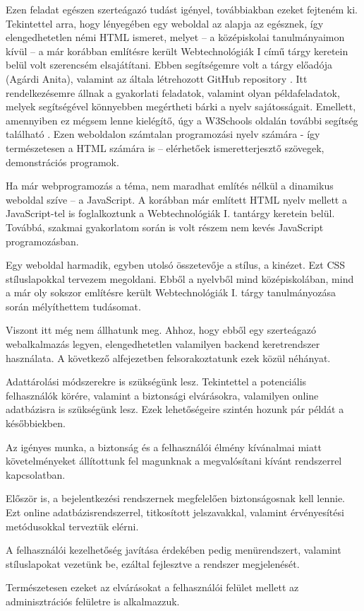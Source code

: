 Ezen feladat egészen szerteágazó tudást igényel, továbbiakban ezeket fejteném ki. Tekintettel arra, hogy lényegében egy weboldal az alapja az egésznek, így elengedhetetlen némi HTML ismeret, melyet – a középiskolai tanulmányaimon kívül – a már korábban említésre került Webtechnológiák I című tárgy keretein belül volt szerencsém elsajátítani. Ebben segítségemre volt a tárgy előadója (Agárdi Anita), valamint az általa létrehozott GitHub repository \cite{webtechgithub}. Itt rendelkezésemre állnak a gyakorlati feladatok, valamint olyan példafeladatok, melyek segítségével könnyebben megértheti bárki a nyelv sajátosságait. Emellett, amennyiben ez mégsem lenne kielégítő, úgy a W3Schools oldalán további segítség található \cite{w3schools}. Ezen weboldalon számtalan programozási nyelv számára - így természetesen a HTML számára is – elérhetőek ismeretterjesztő szövegek, demonstrációs programok.

Ha már webprogramozás a téma, nem maradhat említés nélkül a dinamikus weboldal szíve – a JavaScript. A korábban már említett HTML nyelv mellett a JavaScript-tel is foglalkoztunk a Webtechnológiák I. tantárgy keretein belül. Továbbá, szakmai gyakorlatom során is volt részem nem kevés JavaScript programozásban.

Egy weboldal harmadik, egyben utolsó összetevője a stílus, a kinézet. Ezt CSS stíluslapokkal tervezem megoldani. Ebből a nyelvből mind középiskolában, mind a már oly sokszor említésre került Webtechnológiák I. tárgy tanulmányozása során mélyíthettem tudásomat.

Viszont itt még nem állhatunk meg. Ahhoz, hogy ebből egy szerteágazó webalkalmazás legyen, elengedhetetlen valamilyen backend keretrendszer használata. A következő alfejezetben felsorakoztatunk ezek közül néhányat.

Adattárolási módszerekre is szükségünk lesz. Tekintettel a potenciális felhasználók körére, valamint a biztonsági elvárásokra, valamilyen online adatbázisra is szükségünk lesz. Ezek lehetőségeire szintén hozunk pár példát a későbbiekben.



Az igényes munka, a biztonság és a felhasználói élmény kívánalmai miatt követelményeket állítottunk fel magunknak a megvalósítani kívánt rendszerrel kapcsolatban.

Először is, a bejelentkezési rendszernek megfelelően biztonságosnak kell lennie. Ezt online adatbázisrendszerrel, titkosított jelszavakkal, valamint érvényesítési metódusokkal terveztük elérni.

A felhasználói kezelhetőség javítása érdekében pedig menürendszert, valamint stíluslapokat vezetünk be, ezáltal fejlesztve a rendszer megjelenését.

Természetesen ezeket az elvárásokat a felhasználói felület mellett az adminisztrációs felületre is alkalmazzuk.